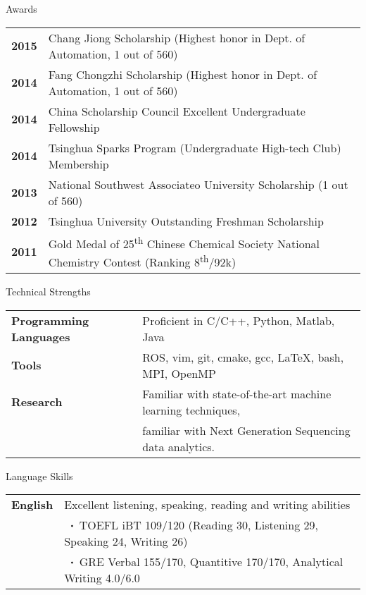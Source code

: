 \documentclass{resume} %
\begin{document}
\begin{rSection}{Awards}

\begin{tabular}{ @{} >{\bfseries}l @{\hspace{3ex}} l }
2015 & Chang Jiong Scholarship (Highest honor in Dept. of Automation, 1 out of 560) \\

2014 & Fang Chongzhi Scholarship (Highest honor in Dept. of Automation, 1 out of 560) \\
2014 & China Scholarship Council Excellent Undergraduate Fellowship \\
2014 &Tsinghua Sparks Program (Undergraduate High-tech Club) Membership \\

2013 & National Southwest Associateo University Scholarship (1 out of 560) \\
2012 & Tsinghua University Outstanding Freshman Scholarship \\
2011 & Gold Medal of 25\textsuperscript{th} Chinese Chemical Society National Chemistry Contest (Ranking 8\textsuperscript{th}/92k)
\end{tabular}

\end{rSection}





\begin{rSection}{Technical Strengths}

\begin{tabular}{ @{} >{\bfseries}l @{\hspace{6ex}} l }
Programming Languages & Proficient in C/C++, Python, Matlab, Java \\
Tools & ROS, vim, git, cmake, gcc, \LaTeX, bash, MPI, OpenMP \\ 
Research & Familiar with state-of-the-art machine learning techniques, \\ & familiar with Next Generation Sequencing data analytics. 
\end{tabular}

\end{rSection}



\begin{rSection}{Language Skills}

\begin{tabular}{ @{} >{\bfseries}l @{\hspace{6ex}} l }


English & Excellent listening, speaking, reading and writing abilities \\ 
 & ~$\LargerCdot$ TOEFL iBT 109/120  (Reading 30, Listening 29, Speaking 24, Writing 26) \\
 & ~$\LargerCdot$ GRE Verbal 155/170, Quantitive 170/170, Analytical Writing 4.0/6.0 \\
 

\end{tabular}

\end{rSection}
\end{document}
